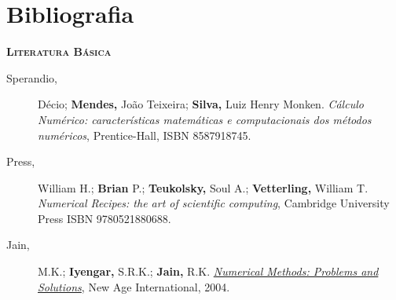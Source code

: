 \section{Bibliografia}

\indent \indent \textbf{\textsc{Literatura Básica}}
\begin{description}

	\item [Sperandio,] Décio; \textbf{Mendes,} João Teixeira; \textbf{Silva,} Luiz Henry Monken. \textit{Cálculo Numérico: características matemáticas e computacionais dos métodos numéricos}, Prentice-Hall, ISBN 8587918745.

	\item [Press,] William H.; \textbf{Brian} P.; \textbf{Teukolsky,} Soul A.; \textbf{Vetterling,} William T. \textit{Numerical Recipes: the art of scientific computing}, Cambridge University Press ISBN 9780521880688.

	\item [Jain,] M.K.; \textbf{Iyengar,} S.R.K.; \textbf{Jain,} R.K. \href{http://site.ebrary.com/lib/univbrasilia/docDetail.action?docID=10318654}{\textit{Numerical Methods: Problems and Solutions}}, New Age International, 2004.

\end{description}

